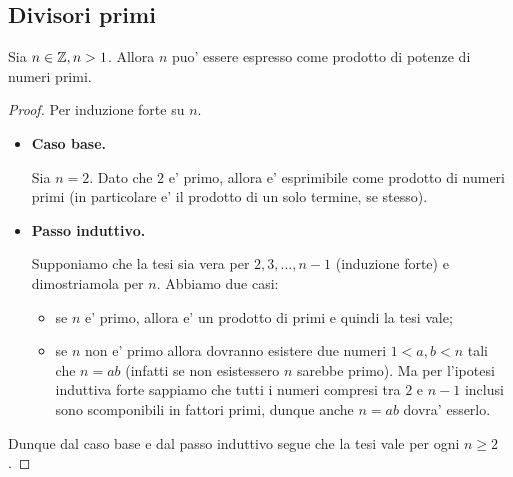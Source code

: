 \subsection{Divisori primi}
\begin{proposition} 
    \label{esistenza_scomposizione_primi}
    Sia $n \in \mathbb{Z}, n > 1$. Allora $n$ puo' essere espresso come prodotto di potenze di numeri primi.
\end{proposition}
\begin{proof}
    Per induzione forte su $n$.
    \begin{itemize}
        \item \textbf{Caso base.}

        Sia $n = 2$. Dato che $2$ e' primo, allora e' esprimibile come prodotto di numeri primi (in particolare e' il prodotto di un solo termine, se stesso).
        \item \textbf{Passo induttivo.}
        
        Supponiamo che la tesi sia vera per $2, 3, \dots, n-1$ (induzione forte) e dimostriamola per $n$.
        Abbiamo due casi:
        \begin{itemize}
            \item se $n$ e' primo, allora e' un prodotto di primi e quindi la tesi vale;
            \item se $n$ non e' primo allora dovranno esistere due numeri $1 < a, b < n$ tali che $n = ab$ (infatti se non esistessero $n$ sarebbe primo). Ma per l'ipotesi induttiva forte sappiamo che tutti i numeri compresi tra $2$ e $n-1$ inclusi sono scomponibili in fattori primi, dunque anche $n = ab$ dovra' esserlo.
        \end{itemize}
    \end{itemize}
    Dunque dal caso base e dal passo induttivo segue che la tesi vale per ogni $n \geq 2$.
\end{proof}


